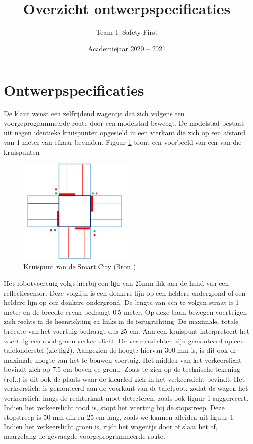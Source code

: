 \documentclass[a4paper,kulak]{kulakarticle} %
\date{Academiejaar 2020 -- 2021}
\title{Overzicht ontwerpspecificaties}
\author{Team 1: Safety First}
\begin{document}
\maketitle

\section{Ontwerpspecificaties}

De klant wenst een zelfrijdend wagentje dat zich volgens een voorgeprogrammeerde route door een modelstad beweegt. De modelstad bestaat uit negen identieke kruispunten opgesteld in een vierkant die zich op een afstand van 1 meter van elkaar bevinden. Figuur \ref{kruispunt} toont een voorbeeld van een van die kruispunten.

\begin{figure}
	\centering
	\includegraphics[width=0.5\textwidth]{kruispunt.png}
	\caption{Kruispunt van de Smart City (Bron )}
	\label{kruispunt}
\end{figure}


Het robotvoertuig volgt hierbij een lijn van 25mm dik aan de hand van een reflectiesensor. Deze volglijn is een donkere lijn op een heldere ondergrond of een heldere lijn op een donkere ondergrond. De lengte van een te volgen straat is 1 meter en de breedte ervan bedraagt 0.5 meter. Op deze baan bewegen voertuigen zich rechts in de heenrichting en links in de terugrichting. De maximale, totale breedte van het voertuig bedraagt dus 25 cm. Aan een kruispunt interpreteert het voertuig een rood-groen verkeerslicht. De verkeerslichten zijn gemonteerd op een tafelonderstel (zie fig2). Aangezien de hoogte hiervan 300 mm is, is dit ook de maximale hoogte van het te bouwen voertuig. Het midden van het verkeerslicht bevindt zich op 7.5 cm boven de grond. Zoals te zien op de technische tekening (ref..) is dit ook de plaats waar de kleurled zich in het verkeerslicht bevindt. Het verkeerslicht is gemonteerd aan de voorkant van de tafelpoot, zodat de wagen het verkeerslicht langs de rechterkant moet detecteren, zoals ook figuur 1 suggereeert.  Indien het verkeerslicht rood is, stopt het voertuig bij de stopstreep. Deze stopstreep is 50 mm dik en 25 cm lang, zoals we kunnen afleiden uit figuur 1. Indien het verkeerslicht groen is, rijdt het wagentje door of slaat het af, naargelang de gevraagde voorgeprogrammeerde route.
\end{document}
